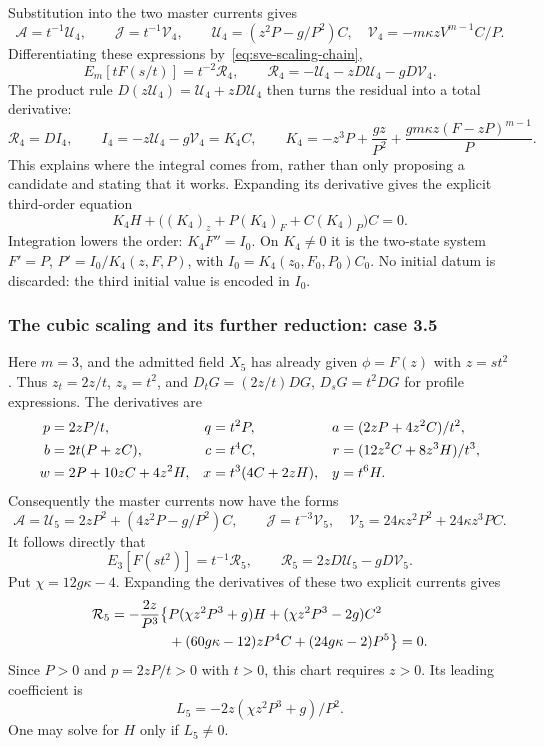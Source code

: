 \documentclass[11pt]{article}
\theoremstyle{definition}
\begin{document}
Substitution into the two master currents gives
\[
 \mathcal A=t^{-1}\mathcal U_4,\qquad
 \mathcal J=t^{-1}\mathcal V_4,\qquad
 \mathcal U_4=(z^2P-g/P^2)C,\quad
 \mathcal V_4=-m\kappa zV^{m-1}C/P.
\]
Differentiating these expressions by~\eqref{eq:sve-scaling-chain},
\begin{equation}
 E_m[tF(s/t)]=t^{-2}\mathcal R_4,\qquad
 \mathcal R_4=-\mathcal U_4-zD\mathcal U_4-gD\mathcal V_4.
 \label{eq:sve-repro-scale-residual}
\end{equation}
The product rule $D(z\mathcal U_4)=\mathcal U_4+zD\mathcal U_4$
then turns the residual into a total derivative:
\begin{equation}
 \mathcal R_4=D I_4,\qquad
 I_4=-z\mathcal U_4-g\mathcal V_4=K_4C,\qquad
 K_4=-z^3P+\frac{gz}{P^2}
                 +\frac{gm\kappa z(F-zP)^{m-1}}P.
 \label{eq:sve-repro-first-integral}
\end{equation}
This explains where the integral comes from, rather than only proposing
a candidate and stating that it works. Expanding its derivative gives
the explicit third-order equation
\begin{equation}
 K_4H+\big((K_4)_z+P(K_4)_F+C(K_4)_P\big)C=0.
 \label{eq:sve-common-expanded}
\end{equation}
Integration lowers the order: $K_4F''=I_0$. On $K_4\ne0$ it is the
two-state system $F'=P$, $P'=I_0/K_4(z,F,P)$, with
$I_0=K_4(z_0,F_0,P_0)C_0$. No initial datum is discarded: the third
initial value is encoded in $I_0$.

\subsubsection{The cubic scaling and its further reduction: case 3.5}
Here $m=3$, and the admitted field $X_5$ has already given
$\phi=F(z)$ with $z=st^2$. Thus $z_t=2z/t$, $z_s=t^2$, and
$D_tG=(2z/t)DG$, $D_sG=t^2DG$ for profile expressions. The derivatives are
\begin{align}
 p&=2zP/t,&q&=t^2P,&a&=(2zP+4z^2C)/t^2,\notag\\
 b&=2t(P+zC),&c&=t^4C,&r&=(12z^2C+8z^3H)/t^3,\notag\\
 w&=2P+10zC+4z^2H,&x&=t^3(4C+2zH),&y&=t^6H.
 \label{eq:sve-cubic-jets}
\end{align}
Consequently the master currents now have the forms
\[
 \mathcal A=\mathcal U_5=2zP^2+(4z^2P-g/P^2)C,\qquad
 \mathcal J=t^{-3}\mathcal V_5,\quad
 \mathcal V_5=24\kappa z^2P^2+24\kappa z^3PC.
\]
It follows directly that
\[
 E_3[F(st^2)]=t^{-1}\mathcal R_5,\qquad
 \mathcal R_5=2zD\mathcal U_5-gD\mathcal V_5.
\]
Put $\chi=12g\kappa-4$. Expanding the derivatives of these two explicit
currents gives
\begin{align}
 \mathcal R_5=-\frac{2z}{P^3}\big\{&
    P(\chi z^2P^3+g)H+(\chi z^2P^3-2g)C^2\notag\\
    &+(60g\kappa-12)zP^4C+(24g\kappa-2)P^5\big\}=0.
 \label{eq:sve-cubic-expanded}
\end{align}
Since $P>0$ and $p=2zP/t>0$ with $t>0$, this
chart requires $z>0$. Its leading coefficient is
\[
 L_5=-2z(\chi z^2P^3+g)/P^2.
\]
One may solve for $H$ only if $L_5\ne0$.
\end{document}
